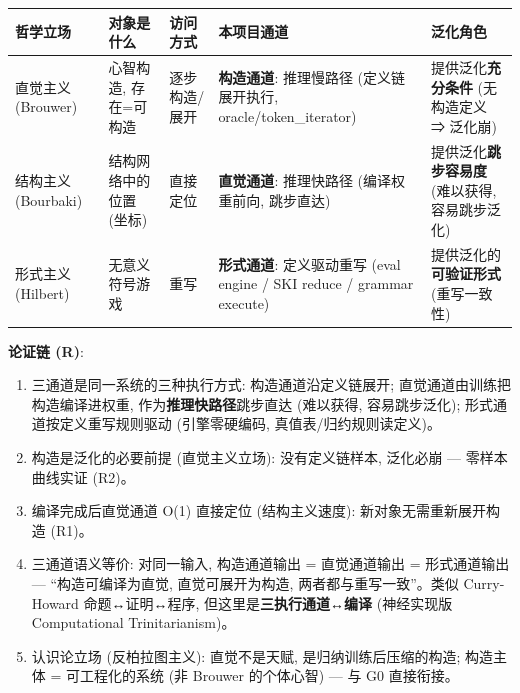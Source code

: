 \documentclass[
]{article}
\providecommand{\tightlist}{%
  \setlength{\itemsep}{0pt}\setlength{\parskip}{0pt}}
\begin{document}
\begin{longtable}[]{@{}
  >{\raggedright\arraybackslash}p{}
  >{\raggedright\arraybackslash}p{}
  >{\raggedright\arraybackslash}p{}
  >{\raggedright\arraybackslash}p{}
  >{\raggedright\arraybackslash}p{}@{}}
\toprule\noalign{}
\begin{minipage}[b]{\linewidth}\raggedright
哲学立场
\end{minipage} & \begin{minipage}[b]{\linewidth}\raggedright
对象是什么
\end{minipage} & \begin{minipage}[b]{\linewidth}\raggedright
访问方式
\end{minipage} & \begin{minipage}[b]{\linewidth}\raggedright
本项目通道
\end{minipage} & \begin{minipage}[b]{\linewidth}\raggedright
泛化角色
\end{minipage} \\
\midrule\noalign{}
\endhead
\bottomrule\noalign{}
\endlastfoot
直觉主义 (Brouwer) & 心智构造, 存在=可构造 & 逐步构造/展开 &
\textbf{构造通道}: 推理慢路径 (定义链展开执行, oracle/token\_iterator) &
提供泛化\textbf{充分条件} (无构造定义 ⇒ 泛化崩) \\
结构主义 (Bourbaki) & 结构网络中的位置 (坐标) & 直接定位 &
\textbf{直觉通道}: 推理快路径 (编译权重前向, 跳步直达) &
提供泛化\textbf{跳步容易度} (难以获得, 容易跳步泛化) \\
形式主义 (Hilbert) & 无意义符号游戏 & 重写 & \textbf{形式通道}:
定义驱动重写 (eval engine / SKI reduce / grammar execute) &
提供泛化的\textbf{可验证形式} (重写一致性) \\
\end{longtable}

\textbf{论证链 (R)}:

\begin{enumerate}
\def\labelenumi{\arabic{enumi}.}
\tightlist
\item
  三通道是同一系统的三种执行方式: 构造通道沿定义链展开;
  直觉通道由训练把构造编译进权重, 作为\textbf{推理快路径}跳步直达
  (难以获得, 容易跳步泛化); 形式通道按定义重写规则驱动 (引擎零硬编码,
  真值表/归约规则读定义)。
\item
  构造是泛化的必要前提 (直觉主义立场): 没有定义链样本, 泛化必崩 ---
  零样本曲线实证 (R2)。
\item
  编译完成后直觉通道 O(1) 直接定位 (结构主义速度):
  新对象无需重新展开构造 (R1)。
\item
  三通道语义等价: 对同一输入, 构造通道输出 = 直觉通道输出 = 形式通道输出
  --- ``构造可编译为直觉, 直觉可展开为构造, 两者都与重写一致''。类似
  Curry-Howard 命题↔证明↔程序, 但这里是\textbf{三执行通道↔编译}
  (神经实现版 Computational Trinitarianism)。
\item
  认识论立场 (反柏拉图主义): 直觉不是天赋, 是归纳训练后压缩的构造;
  构造主体 = 可工程化的系统 (非 Brouwer 的个体心智) --- 与 G0 直接衔接。
\end{enumerate}
\end{document}
